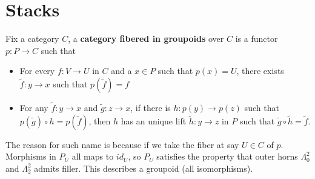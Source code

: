 \section{Stacks}\label{sec:algebraicgeometry-stacks}

\begin{definition}
    \cite{AGStacksProject}
    Fix a category $C$, a \textbf{category fibered in groupoids} over $C$ is a functor $p:P\to C$ such that 
    \begin{itemize}
        \item For every $f:V\to U$ in $C$ and a $x\in P$ such that $p(x)=U$, there exists $\tilde f:y\to x$ such that $p(\tilde f)=f$
\begin{center}
        \end{center}
        \item For any $\tilde f: y\to x$ and $\tilde g: z\to x$, if there is $h: p(y)\to p(z)$ such that $p(\tilde g)\circ h=p(\tilde f)$, then $h$ has an unique lift $\tilde h: y\to z$ in $P$ such that $\tilde g\circ \tilde h=\tilde f$. 
\begin{center}
\end{center}
    \end{itemize}
\end{definition}
The reason for such name is because if we take the fiber at say $U\in C$ of $p$. Morphisms in $P_U$ all maps to $id_U$, so $P_U$ satisfies the property that outer horns $\Lambda^{2}_0$ and $\Lambda^2_2$ admits filler. This describes a groupoid (all isomorphisms).

